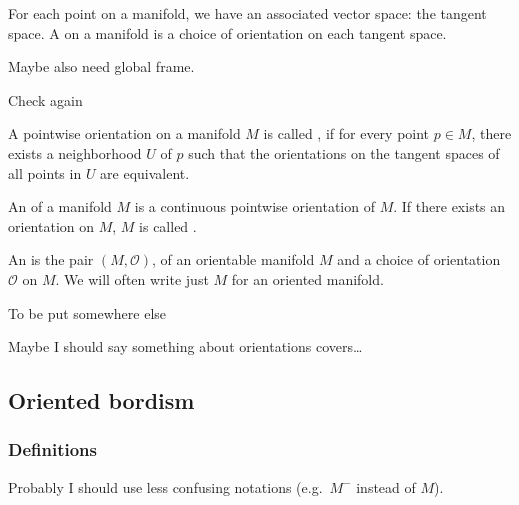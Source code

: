 \documentclass[a4paper,11pt]{article}
\begin{document}
\begin{definition}
    For each point on a manifold, we have an associated vector space: the tangent space. A  on a manifold is a choice of orientation on each tangent space.
\end{definition}

\begin{definition}
\end{definition}
Maybe also need global frame.

Check again
\begin{definition}
    A pointwise orientation on a manifold \(M\) is called , if for every point \(p\in M\), there exists a neighborhood \(U\) of \(p\) such that the orientations on the tangent spaces of all points in \(U\) are equivalent.
\end{definition}

\begin{definition}
    An  of a manifold \(M\) is a continuous pointwise orientation of \(M\). If there exists an orientation on \(M\), \(M\) is called .
\end{definition}

\begin{definition}
    An  is the pair \((M,\mathcal{O})\), of an orientable manifold \(M\) and a choice of orientation \(\mathcal{O}\) on \(M\).
    We will often write just \(M\) for an oriented manifold.
\end{definition}

\begin{definition}
    To be put somewhere else
\end{definition}

Maybe I should say something about orientations covers\dots

\subsection{Oriented bordism}

\subsubsection{Definitions}
Probably I should use less confusing notations (e.g.\ \(M^-\) instead of \(M\)).
\end{document}
